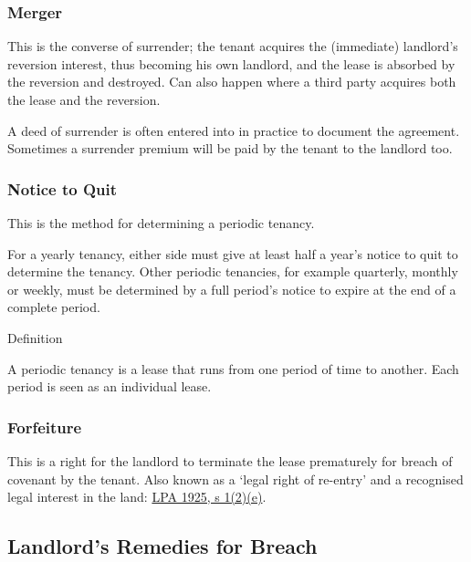 \documentclass[
]{article}
\newenvironment{env-ab392b14-a05f-4d9a-80eb-a63d00eb59ea}
{
    \savenotes\tcolorbox[blanker,breakable,left=5pt,borderline west={2pt}{-4pt}{gold}]
}
{
    \endtcolorbox\spewnotes
}
\begin{document}
\hypertarget{merger}{%
\subsubsection{Merger}\label{merger}}

This is the converse of surrender; the tenant acquires the (immediate)
landlord's reversion interest, thus becoming his own landlord, and the
lease is absorbed by the reversion and destroyed. Can also happen where
a third party acquires both the lease and the reversion.

A deed of surrender is often entered into in practice to document the
agreement. Sometimes a surrender premium will be paid by the tenant to
the landlord too.

\hypertarget{notice-to-quit}{%
\subsubsection{Notice to Quit}\label{notice-to-quit}}

This is the method for determining a periodic tenancy.

For a yearly tenancy, either side must give at least half a year's
notice to quit to determine the tenancy. Other periodic tenancies, for
example quarterly, monthly or weekly, must be determined by a full
period's notice to expire at the end of a complete period.

\begin{env-ab392b14-a05f-4d9a-80eb-a63d00eb59ea}

Definition

A periodic tenancy is a lease that runs from one period of time to
another. Each period is seen as an individual lease.

\end{env-ab392b14-a05f-4d9a-80eb-a63d00eb59ea}

\hypertarget{forfeiture}{%
\subsubsection{Forfeiture}\label{forfeiture}}

This is a right for the landlord to terminate the lease prematurely for
breach of covenant by the tenant. Also known as a `legal right of
re-entry' and a recognised legal interest in the land:
\href{https://www.legislation.gov.uk/ukpga/Geo5/15-16/20/section/1}{LPA
1925, s 1(2)(e)}.

\hypertarget{landlords-remedies-for-breach}{%
\subsection{Landlord's Remedies for
Breach}\label{landlords-remedies-for-breach}}
\end{document}
